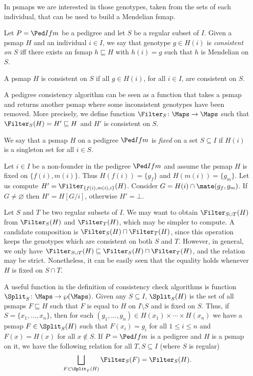 In psmaps we are interested in those genotypes, taken from the sets of 
each individual, that can be used to build a Mendelian fsmap.

\begin{definition}
  Let $P=\Ped I f m$ be a pedigree and let $S$ be a regular subset of $I$.
Given a psmap $H$ and an individual $i\in I$, we say that
genotype $g\in H(i)$ is {\em consistent on $S$} if{}f there exists
an fsmap $h \sqsubseteq H$ with $h(i) = g$ such that $h$ is Mendelian on $S$.

A psmap $H$ is consistent on $S$ if all $g\in H(i)$, for all $i\in I$, are consistent on $S$.
\end{definition}

A pedigree consistency algorithm can be seen as a function that takes a psmap
and returns another psmap where some inconsistent genotypes have been removed.
More precisely, we define function $\Filter_S\colon \Maps \to \Maps$ such that
$\Filter_S(H) = H' \sqsubseteq H$ and $H'$ is consistent on $S$.

We say that a psmap $H$ on a pedigree $\Ped I f m$ is {\em fixed} on a set $S\subseteq I$
if $H(i)$ is a singleton set for all $i \in S$.
\begin{example}
  \label{ex:filter-on-nuclear-family}
Let $i\in I$ be a non-founder 
in the pedigree $\Ped I f m$ and assume the psmap $H$ 
is fixed on $\{f(i), m(i)\}$. Thus $H(f(i))=\{g_f\}$ and $H(m(i))=\{g_m\}$.
Let us compute $H'=\Filter_{\{f(i), m(i), i\}}(H)$. 
Consider $G=H(i)\cap \mate(g_f, g_m)$. If $G\neq\varnothing$ then $H'=H[G/i]$,
otherwise $H' = \bot$.
\end{example}

Let $S$ and $T$ be two regular subsets of $I$. 
We may want to obtain $\Filter_{S\cup T}(H)$
from $\Filter_S(H)$ and $\Filter_T(H)$, which may be simpler to compute.
A candidate composition is $\Filter_S(H)\sqcap\Filter_T(H)$, since this operation
keeps the genotypes which are consistent on both $S$ and $T$.
However, in general, we only have
$\Filter_{S\cup T}(H)\sqsubseteq\Filter_{S}(H)\sqcap\Filter_{T}(H)$,
and the relation may be strict.
Nonetheless, it can be easily seen that the
equality holds whenever 
$H$ is fixed on $S\cap T$.

A useful function in the definition
of consistency check algorithms is function $\Split_S\colon \Maps\to\wp(\Maps)$.
Given any $S\subseteq I$, $\Split_S(H)$ is the set of all psmaps $F\sqsubseteq H$
such that $F$ is equal to $H$
on $I\setminus S$ and is fixed on $S$.
Thus, if $S=\{x_1, \ldots, x_n\}$, then
for each $(g_1, \ldots, g_n)\in H(x_1)\times\cdots\times H(x_n)$
we have a psmap $F\in\Split_S(H)$ such that $F(x_i) = g_i$ for all $1\le i \le n$
and $F(x) = H(x)$ for all $x\not\in S$.
If $P=\Ped I f m$ is a pedigree and $H$ is a psmap on it,
we have the following relation for all $T, S \subseteq I$ (where $S$ is regular)
\begin{equation}
  \label{eq:split-filter-sup}
  \bigsqcup_{F\in\Split_T(H)} \Filter_S(F) = \Filter_S(H).
\end{equation}

